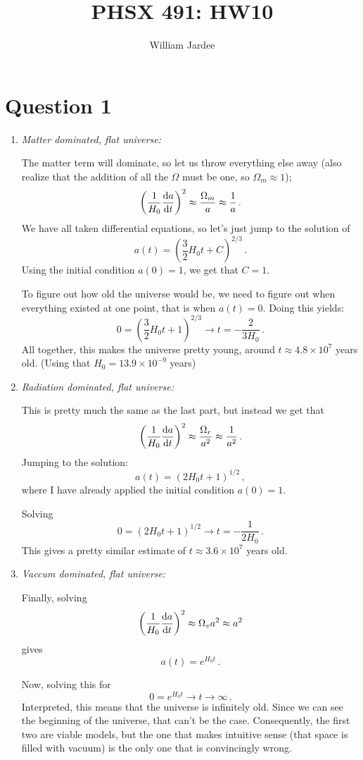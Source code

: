 \documentclass[11pt]{article}
\begin{document}
\title{PHSX 491: HW10}
\author{William Jardee}
\maketitle

\section*{Question 1}
\begin{enumerate}[label=\alph*)]
\item \textit{Matter dominated, flat universe:}

The matter term will dominate, so let us throw everything else away (also realize that the addition of all the $\Omega$ must be one, so $\Omega_m \approx 1$);
\[\left(\frac{1}{H_0}\dv{a}{t}\right)^2 \approx \frac{\Omega_m}{a} \approx \frac{1}{a} \, .\]
We have all taken differential equations, so let's just jump to the solution of
\[a(t) = \left(\frac{3}{2}H_0t + C\right)^{2/3} \, .\]
Using the initial condition $a(0) = 1$, we get that $C=1$. 

To figure out how old the universe would be, we need to figure out when everything existed at one point, that is when $a(t)=0$. Doing this yields:
\[0 = \left(\frac{3}{2}H_0 t+1\right)^{2/3} \longrightarrow \boxed{t = -\frac{2}{3 H_0}} \, .\]
All together, this makes the universe pretty young, around $t \approx 4.8 \times 10^{7}$ years old. (Using that $H_0 = 13.9 \times 10^{-9}$ years)

\item \textit{Radiation dominated, flat universe:}

This is pretty much the same as the last part, but instead we get that 
\[\left(\frac{1}{H_0}\dv{a}{t}\right)^2 \approx \frac{\Omega_r}{a^2} \approx \frac{1}{a^2} \, .\]
Jumping to the solution:
\[a(t) = \left(2H_0t+1\right)^{1/2} \, ,\]
where I have already applied the initial condition $a(0) = 1$. 

Solving 
\[ 0 = \left(2H_0t+1\right)^{1/2} \longrightarrow \boxed{t = -\frac{1}{2H_0}} \, .\]
This gives a pretty similar estimate of $t \approx 3.6 \times 10^{7}$ years old.

\item \textit{Vaccum dominated, flat universe:}

Finally, solving 
\[\left(\frac{1}{H_0}\dv{a}{t}\right)^2 \approx \Omega_v a^2 \approx a^2\]
gives
\[a(t) = e^{H_0 t} \, .\]

Now, solving this for 
\[ 0 = e^{H_0 t} \longrightarrow \boxed{t \rightarrow \infty} \, .\]
Interpreted, this means that the universe is infinitely old. Since we can see the beginning of the universe, that can't be the case. Consequently, the first two are viable models, but the one that makes intuitive sense (that space is filled with vacuum) is the only one that is convincingly wrong. 

\end{enumerate}
\end{document}
